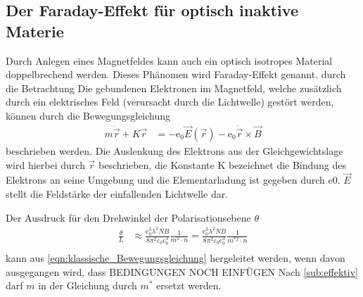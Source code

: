 \subsection{Der Faraday-Effekt für optisch inaktive Materie}
\label{sub:Faraday}
Durch Anlegen eines Magnetfeldes kann auch ein optisch isotropes Material doppelbrechend werden.
Dieses Phänomen wird Faraday-Effekt genannt.
durch die Betrachtung
Die gebundenen Elektronen im Magnetfeld, welche zusätzlich durch ein elektrisches
Feld (verursacht durch die Lichtwelle) gestört werden, können durch die Bewegungsgleichung
\begin{align}
    m\ddot{\vec{r}}+K\vec{r}&=-\text{e}_0\vec{E}(\vec{r})-\text{e}_0\dot{\vec{r}}\times\vec{B}
    \label{eqn:klassische_Bewegungsgleichung}
\end{align}
beschrieben werden.
Die Auslenkung des Elektrons aus der Gleichgewichtslage wird hierbei durch $\vec{r}$ beschrieben, die
Konstante K bezeichnet die Bindung des Elektrons an seine Umgebung und die Elementarladung ist gegeben durch e0.
$\vec{E}$ stellt die Feldstärke der einfallenden Lichtwelle dar.

Der Ausdruck für den Drehwinkel der Polarisationsebene $\theta$ 
\begin{align}
   \frac{\theta}{L}& \approx \frac{\text{e}_0^3\lambda^2 NB}{8\pi^2\varepsilon_0\text{c}_0^3}\frac{1}{m^2 \cdot n} = \frac{\text{e}_0^3\lambda^2 NB}{8\pi^2\varepsilon_0\text{c}_0^3}\frac{1}{m^{*2} \cdot n}\\
    \label{eqn:drehwinkel}
\end{align}
kann aus \autoref{eqn:klassische_Bewegungsgleichung} hergeleitet werden, wenn davon ausgegangen wird, dass
BEDINGUNGEN NOCH EINFÜGEN
Nach \autoref{sub:effektiv} darf $m$ in der Gleichung durch $m^*$ ersetzt werden.